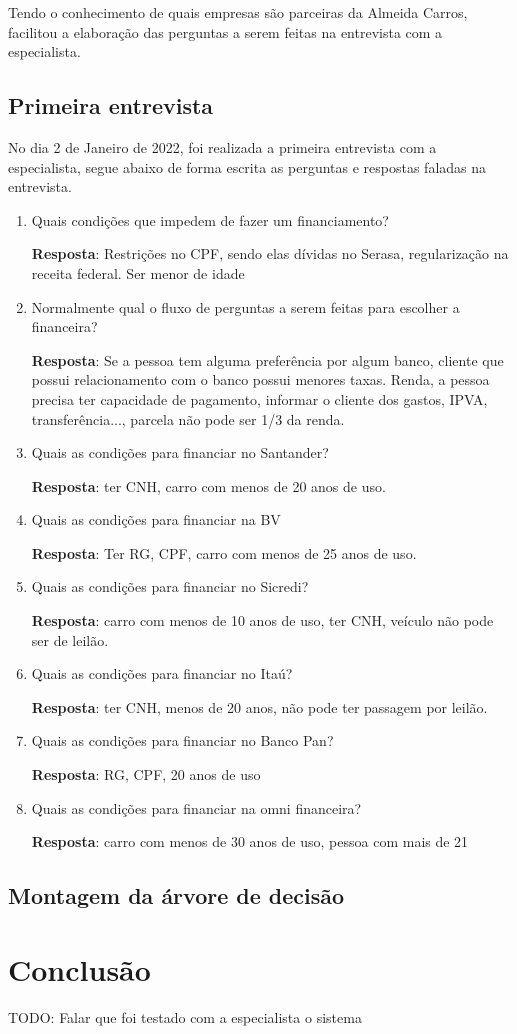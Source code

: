 \documentclass[12pt, a4paper]{article}
\begin{document}
Tendo o conhecimento de quais empresas são parceiras da Almeida Carros, facilitou a elaboração das perguntas a serem feitas na entrevista com a especialista.

\subsection{Primeira entrevista}
No dia 2 de Janeiro de 2022, foi realizada a primeira entrevista com a especialista, segue abaixo de forma escrita as perguntas e respostas faladas na entrevista.
\begin{enumerate}
    \item Quais condições que impedem de fazer um financiamento?

    \textbf{Resposta}: Restrições no CPF, sendo elas dívidas no Serasa, regularização na receita federal. Ser menor de idade

    \item Normalmente qual o fluxo de perguntas a serem feitas para escolher a financeira?

    \textbf{Resposta}: Se a pessoa tem alguma preferência por algum banco, cliente que possui relacionamento com o banco possui menores taxas. Renda, a pessoa precisa ter capacidade de pagamento, informar o cliente dos gastos, IPVA, transferência..., parcela não pode ser 1/3 da renda.

    \item Quais as condições para financiar no Santander?

    \textbf{Resposta}: ter CNH, carro com menos de 20 anos de uso.

    \item Quais as condições para financiar na BV

    \textbf{Resposta}: Ter RG, CPF, carro com menos de 25 anos de uso.

    \item Quais as condições para financiar no Sicredi?

    \textbf{Resposta}: carro com menos de 10 anos de uso, ter CNH, veículo não pode ser de leilão.

    \item Quais as condições para financiar no Itaú?

    \textbf{Resposta}: ter CNH, menos de 20 anos, não pode ter passagem por leilão.

    \item Quais as condições para financiar no Banco Pan?

    \textbf{Resposta}: RG, CPF, 20 anos de uso

    \item Quais as condições para financiar na omni financeira?

    \textbf{Resposta}: carro com menos de 30 anos de uso, pessoa com mais de 21
\end{enumerate}

\subsection{Montagem da árvore de decisão}

\section{Conclusão}\label{sec:conclusao}
TODO: Falar que foi testado com a especialista o sistema

\cleardoublepage

\end{document}
